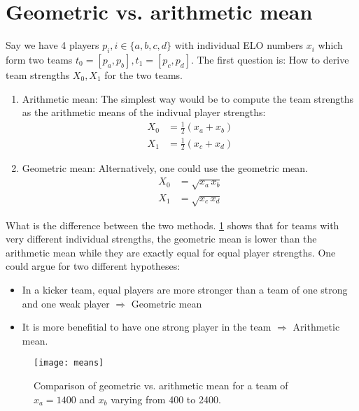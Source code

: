 \documentclass[a4paper,10pt]{article}
\begin{document}
\section{Geometric vs. arithmetic mean}
Say we have 4 players $p_i, i \in \{a,b,c,d \}$ with individual ELO numbers $x_i$ which form two teams $t_0 = [p_a, p_b], t_1 = [p_c,p_d]$.
The first question is: How to derive team strengths $X_0,X_1$ for the two teams.
\begin{enumerate}
\item Arithmetic mean: The simplest way would be to compute the team strengths as the arithmetic means of the indivual player strengths:
  \begin{eqnarray}
    X_0 &= \frac{1}{2} \left(x_a+x_b \right) \\
    X_1 &= \frac{1}{2} \left(x_c+x_d \right) 
  \end{eqnarray}
\item Geometric mean: Alternatively, one could use the geometric mean.
  \begin{eqnarray}
    X_0 &= \sqrt{x_a \, x_b } \\
    X_1 &= \sqrt{x_c \,x_d } 
  \end{eqnarray}
\end{enumerate}

What is the difference between the two methods. \ref{fig:means} shows that for teams with very different individual strengths, the geometric mean is lower than the arithmetic mean while they are exactly equal for equal player strengths. One could argue for two different hypotheses:
\begin{itemize}
\item In a kicker team, equal players are more stronger than a team of one strong and one weak player $\Rightarrow$ Geometric mean
\item It is more benefitial to have one strong player in the team $\Rightarrow$ Arithmetic mean.
\end{itemize}

\begin{figure}
\texttt{[image: means]}
    \caption{Comparison of geometric vs. arithmetic mean for a team of $x_a=1400$ and $x_b$ varying from 400 to 2400.}
  \label{fig:means}
\end{figure}
\end{document}
